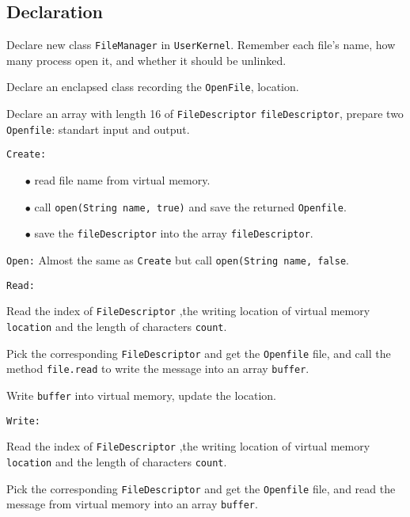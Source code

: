 \documentclass{article}
\begin{document}
\subsection{Declaration}
\begin{compactitem}
\item Declare new class \texttt{FileManager} in \texttt{UserKernel}. Remember each file's name, how many process open it, and whether it should 
	be unlinked.
\item Declare an enclapsed  class recording the \texttt{OpenFile}, location.
\item Declare an array with length 16 of \texttt{FileDescriptor} \texttt{fileDescriptor}, prepare two \texttt{Openfile}: standart input and output.
\item \texttt{Create:}
	\begin{enumerate}
		\item[$\bullet$] read file name from virtual memory.
		\item[$\bullet$] call \texttt{open(String name, true)} and save the returned \texttt{Openfile}.
		\item[$\bullet$] save the \texttt{fileDescriptor} into the array \texttt{fileDescriptor}.
	\end{enumerate}
\item \texttt{Open:} Almost the same as \texttt{Create} but call \texttt{open(String name, false}.
\item \texttt{Read:}
	\begin{compactitem}
		\item Read the index of \texttt{FileDescriptor} ,the writing location of virtual memory \texttt{location} and the length of characters \texttt{count}.
		\item Pick the corresponding \texttt{FileDescriptor} and get the \texttt{Openfile} file, and call the method \texttt{file.read} to write the message into an array \texttt{buffer}.
		\item Write \texttt{buffer} into virtual memory, update the location.
	\end{compactitem}
\item \texttt{Write:}
	\begin{compactitem}
		\item Read the index of \texttt{FileDescriptor} ,the writing location of virtual memory \texttt{location} and the length of characters \texttt{count}.
		\item Pick the corresponding \texttt{FileDescriptor} and get the \texttt{Openfile} file, and read the message from virtual memory into an array \texttt{buffer}.

\end{compactitem}
\end{compactitem}
\end{document}
